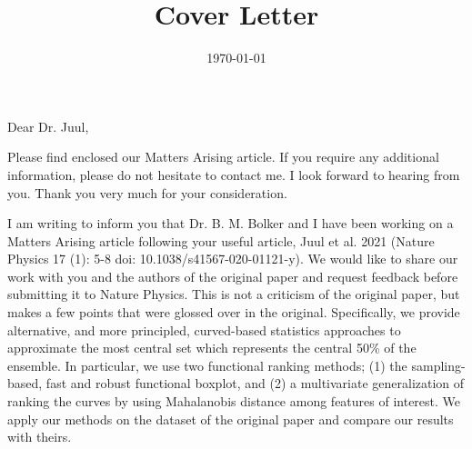 \documentclass[11pt,a4paper,roman]{moderncv}
\title{Cover Letter}
\begin{document}
\date{\today}
\opening{Dear Dr. Juul,}

\closing{Please find enclosed our Matters Arising article. If you require any additional information, please do not hesitate to contact me. I look forward to hearing from you.
Thank you very much for your consideration.}

\makelettertitle

I am writing to inform you that Dr. B. M. Bolker and I have been working on a Matters Arising article following your useful article, Juul et al. 2021 (Nature Physics 17 (1): 5-8 doi: 10.1038/s41567-020-01121-y).
We would like to share our work with you and the authors of the original paper and request feedback before submitting it to Nature Physics.
This is not a criticism of the original paper, but makes a few points that were glossed over in the original. Specifically, 
we provide alternative, and more principled, curved-based statistics approaches to approximate the most central set which represents the central 50\% of the ensemble. In particular, we use two functional ranking methods; (1) the sampling-based, fast and robust functional boxplot, and (2) a multivariate generalization of ranking the curves by using Mahalanobis distance among features of interest. We apply our methods on the dataset of the original paper and compare our results with theirs.

\vspace{0.5cm}
\makeletterclosing
\end{document}
